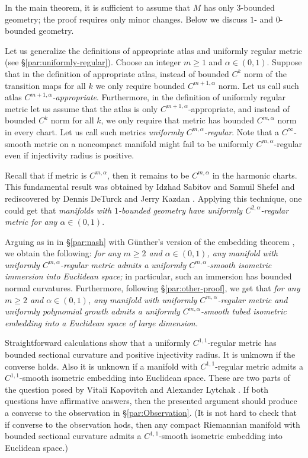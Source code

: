 \arxiv{\documentclass[a4paper,10pt]{article}}{\documentclass{mjm}}
\begin{document}
In the main theorem, it is sufficient to assume that $M$ has only $3$-bounded geometry;
the proof requires only minor changes.
Below we discuss $1$- and $0$-bounded geometry.

Let us generalize the definitions of appropriate atlas and uniformly regular metric (see §\ref{par:uniformly-regular}).
Choose an integer $m\ge 1$ and $\alpha\in(0,1)$.
Suppose that in the definition of appropriate atlas,
instead of bounded $C^k$ norm of the transition maps for all $k$ 
we only require bounded $C^{m+1,\alpha}$ norm.
Let us call such atlas \emph{$C^{m+1,\alpha}$-appropriate}.
Furthermore, in the definition of uniformly regular metric let us assume that the atlas is only $C^{m+1,\alpha}$-appropriate, and instead of bounded $C^k$ norm for all $k$,
we only require that metric has bounded $C^{m,\alpha}$ norm in every chart.
Let us call such metrics \emph{uniformly $C^{m,\alpha}$-regular}.
Note that a $C^\infty$-smooth metric on a noncompact manifold might fail to be uniformly $C^{m,\alpha}$-regular even if injectivity radius is positive.

Recall that if metric is $C^{m,\alpha}$, then it remains to be $C^{m,\alpha}$ in the harmonic charts.
This fundamental result was obtained by Idzhad Sabitov and Samuil Shefel \cite{sabitov-shefel} and rediscovered by Dennis DeTurck and Jerry Kazdan \cite{deturck-kazdan}.
Applying this technique, one could get that \textit{manifolds with $1$-bounded geometry have uniformly $C^{2,\alpha}$-regular metric for any $\alpha\in (0,1)$}.

Arguing as in in §\ref{par:nash} with Günther's version of the embedding theorem \cite{guenther},
we obtain the following: \textit{for any $m\ge 2$ and $\alpha\in(0,1)$, any manifold with uniformly $C^{m,\alpha}$-regular metric admits a uniformly $C^{m,\alpha}$-smooth isometric immersion into Euclidean space;}
in particular, such an immersion has bounded normal curvatures.
Furthermore, following §\ref{par:other-proof}, we get that
\textit{for any $m\ge 2$ and $\alpha\in(0,1)$, any manifold with uniformly $C^{m,\alpha}$-regular metric and uniformly polynomial growth admits a uniformly $C^{m,\alpha}$-smooth tubed isometric embedding into a Euclidean space of large dimension.}

Straightforward calculations show that a uniformly $C^{1,1}$-regular metric has bounded sectional curvature and positive injectivity radius.
It is unknown if the converse holds.
Also it is unknown if a manifold with $C^{1,1}$-regular metric admits a $C^{1,1}$-smooth isometric embedding into Euclidean space.
These are two parts of the question posed by Vitali Kapovitch and Alexander Lytchak \cite[1.10]{kapovitch-lytchak}.
If both questions have affirmative answers, then the presented argument should produce a converse to the observation in §\ref{par:Observation}.
(It is not hard to check that if converse to the observation hods, then any compact Riemannian manifold with bounded sectional curvature admits a $C^{1,1}$-smooth isometric embedding into Euclidean space.)
\end{document}
